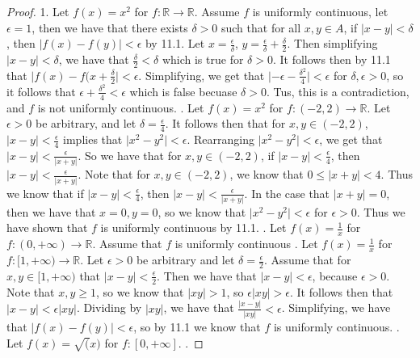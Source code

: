 \documentclass[12pt]{article}
\newcommand{\bbR}{\mathbb{R}}
\providecommand{\abs}[1]{\lvert #1 \rvert}
\renewcommand{\_}[1]{\underline{ #1 }}
\theoremstyle{definition}
\numberwithin{equation}{subsection}
\begin{document}
\begin{proof}
1. Let $f(x) = x^2$ for $f : \bbR \to \bbR$. Assume $f$ is uniformly continuous, let $\epsilon = 1$, then we have that there exists $\delta > 0$ such that for all $x,y \in A$, if $\abs{x - y} < \delta$, then $\abs{f(x) - f(y)} < \epsilon$ by 11.1. Let $x = \frac{\epsilon}{\delta}$, $y = \frac{\epsilon}{\delta} + \frac{\delta}{2}$. Then simplifying $\abs{x - y} < \delta$, we have that $\frac{\delta}{2} < \delta$ which is true for $\delta > 0$. It follows then by 11.1 that $\abs{f(x) - f(x + \frac{\delta}{2}} < \epsilon$. Simplifying, we get that $\abs{-\epsilon - \frac{\delta^2}{4}} < \epsilon$ for $\delta, \epsilon > 0$, so it follows that $\epsilon + \frac{\delta^2}{4} < \epsilon$ which is false becuase $\delta > 0$. Tus, this is a contradiction, and $f$ is not uniformly continuous. . Let $f(x) = x^2$ for $f : (-2,2) \to \bbR$. Let $\epsilon > 0$ be arbitrary, and let $\delta = \frac{\epsilon}{4}$. It follows then that for $x,y \in (-2,2)$, $\abs{x - y} < \frac{\epsilon}{4}$ implies that $\abs{x^2 - y^2} < \epsilon$. Rearranging $\abs{x^2 - y^2} < \epsilon$, we get that $\abs{x - y} < \frac{\epsilon}{\abs{x + y}}$. So we have that for $x,y \in (-2,2)$, if $\abs{x - y} < \frac{\epsilon}{4}$, then $\abs{x - y} < \frac{\epsilon}{\abs{x + y}}$. Note that for $x,y \in (-2,2)$, we know that $0 \leq \abs{x + y} < 4$. Thus we know that if $\abs{x-y} < \frac{\epsilon}{4}$, then $\abs{x-y} < \frac{\epsilon}{\abs{x+y}}$. In the case that $\abs{x + y} = 0$, then we have that $x = 0, y = 0$, so we know that $\abs{x^2 - y^2} < \epsilon$ for $\epsilon > 0$. Thus we have shown that $f$ is uniformly continuous by 11.1. . Let $f(x) = \frac{1}{x}$ for $f : (0, +\infty) \to \bbR$. Assume that $f$ is uniformly continuous . Let $f(x) = \frac{1}{x}$ for $f : [1, +\infty) \to \bbR$. Let $\epsilon > 0$ be arbitrary and let $\delta = \frac{\epsilon}{2}$. Assume that for $x,y \in [1, +\infty)$ that $\abs{x - y} < \frac{\epsilon}{2}$. Then we have that $\abs{x - y} < \epsilon$, because $\epsilon > 0$. Note that $x,y \geq 1$, so we know that $\abs{xy} > 1$, so $\epsilon \abs{xy} > \epsilon$. It follows then that $\abs{x-y} < \epsilon \abs{xy}$. Dividing by $\abs{xy}$, we have that $\frac{\abs{x-y}}{\abs{xy}} < \epsilon$. Simplifying, we have that $\abs{f(x) - f(y)} < \epsilon$, so by 11.1 we know that $f$ is uniformly continuous. . Let $f(x) = \sqrt(x)$ for $f : [0, +\infty]$. . 
\end{proof}
\end{document}
